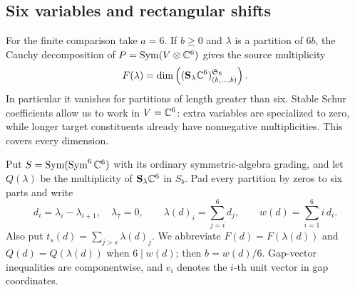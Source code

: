 \subsection{Six variables and rectangular shifts}
For the finite comparison take \(a=6\). If \(b\ge0\) and
\(\lambda\) is a partition of \(6b\), the Cauchy decomposition of
\(P=\operatorname{Sym}(V\otimes\mathbb C^6)\)
\cite[Exercise~6.11(b)]{FultonHarris1991} gives the source multiplicity
\begin{equation}\label{eq:label-multiplicity}
 F(\lambda)=\dim\left((\mathbf S_\lambda\mathbb C^6)_{(b,\ldots,b)}^{\mathfrak S_6}\right).
\end{equation}
In particular it vanishes for partitions of length greater than six.
Stable Schur coefficients allow us to work in \(V=\mathbb C^6\): extra
variables are specialized to zero, while longer target constituents
already have nonnegative multiplicities. This covers every dimension.

Put \(S=\operatorname{Sym}(\operatorname{Sym}^6\mathbb C^6)\) with its ordinary symmetric-algebra grading,
and let \(Q(\lambda)\) be the multiplicity of \(\mathbf S_\lambda\mathbb C^6\)
in \(S_b\). Pad every partition by zeros to six parts and write
\[
 d_i=\lambda_i-\lambda_{i+1},\quad \lambda_7=0,\qquad
 \lambda(d)_i=\sum_{j=i}^6d_j,\qquad
 w(d)=\sum_{i=1}^6 i\,d_i.
\]
Also put \(t_s(d)=\sum_{j>s}\lambda(d)_j\). We abbreviate
\(F(d)=F(\lambda(d))\) and \(Q(d)=Q(\lambda(d))\) when \(6\mid w(d)\);
then \(b=w(d)/6\). Gap-vector inequalities are componentwise, and \(e_i\)
denotes the \(i\)-th unit vector in gap coordinates.

